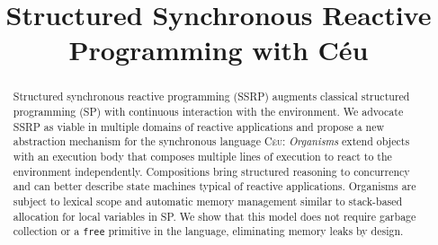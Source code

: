 \documentclass[preprint]{sigplanconf}
\newcommand{\CEU}{\textsc{C\'{e}u}\xspace}
\newcommand{\code}[1] {{\small{\texttt{#1}}}}
\newcommand{\1}{\;}
\newcommand{\2}{\;\;}
\newcommand{\3}{\;\;\;}
\newcommand{\5}{\;\;\;\;\;}
\begin{document}
\sloppy

\setlength{\pdfpageheight}{\paperheight}
\setlength{\pdfpagewidth}{\paperwidth}


\title {
    Structured Synchronous Reactive Programming with C\'eu
}


\authorinfo{}{}{}

\maketitle

\begin{abstract}
Structured synchronous reactive programming (SSRP) augments classical 
structured programming (SP) with continuous interaction with the environment.
%
We advocate SSRP as viable in multiple domains of reactive applications and 
propose a new abstraction mechanism for the synchronous language \CEU:
%
\emph{Organisms} extend objects with an execution body that composes multiple 
lines of execution to react to the environment independently.
%
Compositions bring structured reasoning to concurrency and can better describe 
state machines typical of reactive applications.
%
Organisms are subject to lexical scope and automatic memory management similar 
to stack-based allocation for local variables in SP.
We show that this model does not require garbage collection or a \code{free} 
primitive in the language, eliminating memory leaks by design.
\end{abstract}

\end{document}

